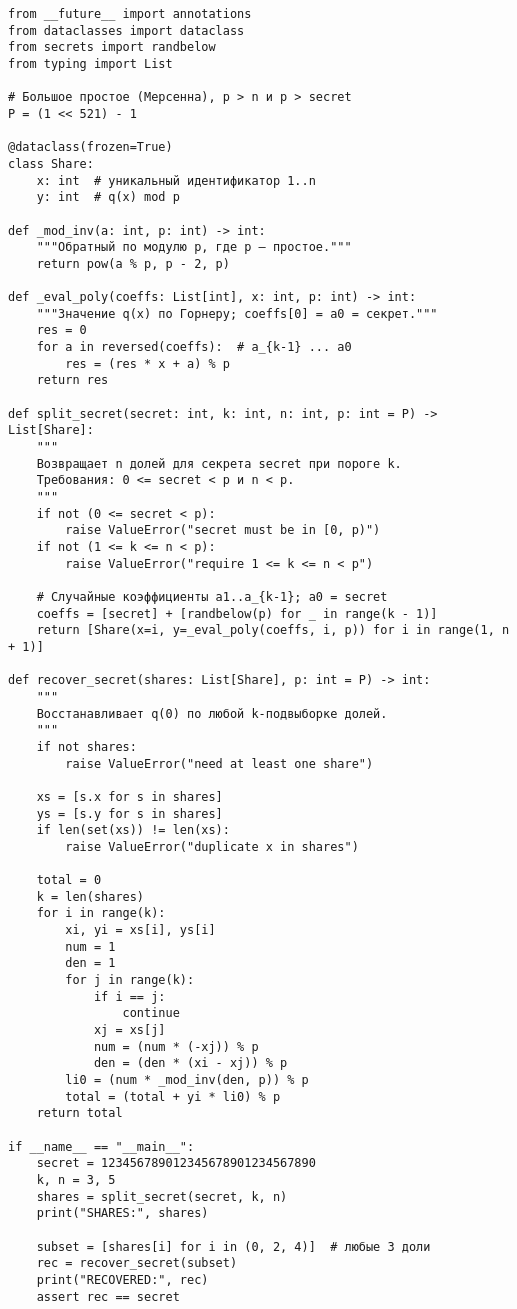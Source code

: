 \documentclass[a4paper,12pt]{article}
\begin{document}
\begin{lstlisting}[style=py]
from __future__ import annotations
from dataclasses import dataclass
from secrets import randbelow
from typing import List

# Большое простое (Мерсенна), p > n и p > secret
P = (1 << 521) - 1

@dataclass(frozen=True)
class Share:
    x: int  # уникальный идентификатор 1..n
    y: int  # q(x) mod p

def _mod_inv(a: int, p: int) -> int:
    """Обратный по модулю p, где p — простое."""
    return pow(a % p, p - 2, p)

def _eval_poly(coeffs: List[int], x: int, p: int) -> int:
    """Значение q(x) по Горнеру; coeffs[0] = a0 = секрет."""
    res = 0
    for a in reversed(coeffs):  # a_{k-1} ... a0
        res = (res * x + a) % p
    return res

def split_secret(secret: int, k: int, n: int, p: int = P) -> List[Share]:
    """
    Возвращает n долей для секрета secret при пороге k.
    Требования: 0 <= secret < p и n < p.
    """
    if not (0 <= secret < p):
        raise ValueError("secret must be in [0, p)")
    if not (1 <= k <= n < p):
        raise ValueError("require 1 <= k <= n < p")

    # Случайные коэффициенты a1..a_{k-1}; a0 = secret
    coeffs = [secret] + [randbelow(p) for _ in range(k - 1)]
    return [Share(x=i, y=_eval_poly(coeffs, i, p)) for i in range(1, n + 1)]

def recover_secret(shares: List[Share], p: int = P) -> int:
    """
    Восстанавливает q(0) по любой k-подвыборке долей.
    """
    if not shares:
        raise ValueError("need at least one share")

    xs = [s.x for s in shares]
    ys = [s.y for s in shares]
    if len(set(xs)) != len(xs):
        raise ValueError("duplicate x in shares")

    total = 0
    k = len(shares)
    for i in range(k):
        xi, yi = xs[i], ys[i]
        num = 1
        den = 1
        for j in range(k):
            if i == j:
                continue
            xj = xs[j]
            num = (num * (-xj)) % p
            den = (den * (xi - xj)) % p
        li0 = (num * _mod_inv(den, p)) % p
        total = (total + yi * li0) % p
    return total

if __name__ == "__main__":
    secret = 123456789012345678901234567890
    k, n = 3, 5
    shares = split_secret(secret, k, n)
    print("SHARES:", shares)

    subset = [shares[i] for i in (0, 2, 4)]  # любые 3 доли
    rec = recover_secret(subset)
    print("RECOVERED:", rec)
    assert rec == secret
\end{lstlisting}
\end{document}
